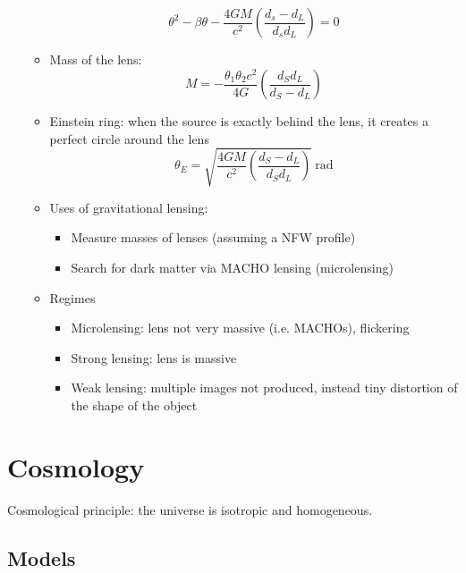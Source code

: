 \documentclass{book}
\begin{document}
\begin{itemize}
\begin{itemize}
\begin{equation*}
                        \theta^2 - \beta \theta - \frac{4 G M}{c^2} \left( \frac{d_s - d_L}{d_s d_L} \right) = 0 \tag{C\&O 28.21}
                    \end{equation*}
              \item Mass of the lens:
                    \begin{equation*}
                        M = - \frac{\theta_1 \theta_2 c^2}{4 G} \left( \frac{d_S d_L}{d_S - d_L} \right) \tag{C\&O 28.23}
                    \end{equation*}
              \item Einstein ring: when the source is exactly behind the lens, it creates a perfect circle around the lens
                    \begin{equation*}
                        \theta_E = \sqrt{\frac{4 G M}{c^2} \left( \frac{d_S - d_L}{d_S d_L} \right) }\ \text{rad} \tag{C\&O 28.24}
                    \end{equation*}
              \item Uses of gravitational lensing:
                    \begin{itemize}
                        \item Measure masses of lenses (assuming a NFW profile)
                        \item Search for dark matter via MACHO lensing (microlensing)
                    \end{itemize}
              \item Regimes
                    \begin{itemize}
                        \item Microlensing: lens not very massive (i.e. MACHOs), flickering
                        \item Strong lensing: lens is massive
                        \item Weak lensing: multiple images not produced, instead tiny distortion of the shape of the object
                    \end{itemize}
          \end{itemize}
\end{itemize}
\section{Cosmology}
Cosmological principle: the universe is isotropic and homogeneous.
\subsection{Models}
\end{document}
